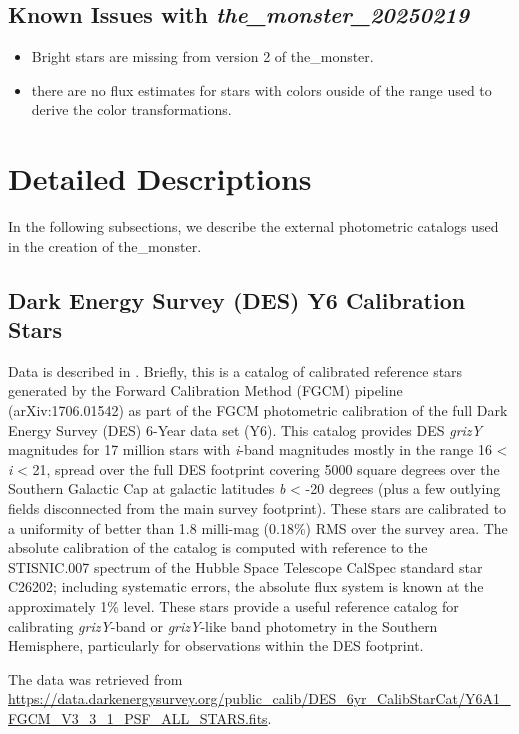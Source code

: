 
\newpage

\subsection{Known Issues with \emph{the\_monster\_20250219}}
\begin{itemize}
    \item Bright stars are missing from version 2 of the\_monster.
    \item there are no flux estimates for stars with colors ouside of the range used to derive the color transformations.
\end{itemize}

\section{Detailed Descriptions}
\label{sec:details}
In the following subsections, we describe the external photometric catalogs used in the creation of the\_monster.

\subsection{Dark Energy Survey (DES) Y6 Calibration Stars}
\label{sec:des}
Data is described in \citep{Rykoff:2023}.
Briefly, this is a catalog of calibrated reference stars generated by the Forward Calibration Method (FGCM) pipeline (arXiv:1706.01542) as part of the FGCM photometric calibration of the full Dark Energy Survey (DES) 6-Year data set (Y6). This catalog provides DES \textit{grizY} magnitudes for 17 million stars with \textit{i}-band magnitudes mostly in the range 16 < \textit{i} < 21, spread over the full DES footprint covering 5000 square degrees over the Southern Galactic Cap at galactic latitudes \textit{b} < -20 degrees (plus a few outlying fields disconnected from the main survey footprint). 
These stars are calibrated to a uniformity of better than 1.8 milli-mag (0.18\%) RMS over the survey area. 
The absolute calibration of the catalog is computed with reference to the STISNIC.007 spectrum of the Hubble Space Telescope CalSpec standard star C26202; including systematic errors, the absolute flux system is known at the approximately 1\% level. 
These stars provide a useful reference catalog for calibrating \textit{grizY}-band or \textit{grizY}-like band photometry in the Southern Hemisphere, particularly for observations within the DES footprint.

The data was retrieved from \url{https://data.darkenergysurvey.org/public_calib/DES_6yr_CalibStarCat/Y6A1_FGCM_V3_3_1_PSF_ALL_STARS.fits}.

